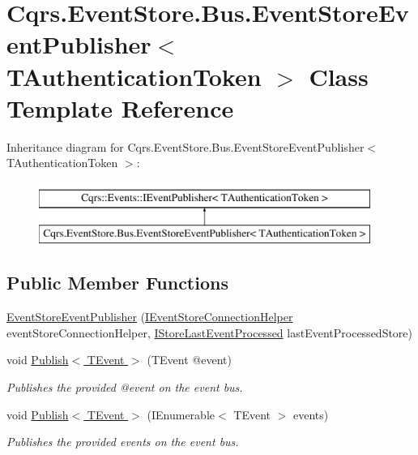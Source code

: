 \hypertarget{classCqrs_1_1EventStore_1_1Bus_1_1EventStoreEventPublisher}{}\section{Cqrs.\+Event\+Store.\+Bus.\+Event\+Store\+Event\+Publisher$<$ T\+Authentication\+Token $>$ Class Template Reference}
\label{classCqrs_1_1EventStore_1_1Bus_1_1EventStoreEventPublisher}
Inheritance diagram for Cqrs.\+Event\+Store.\+Bus.\+Event\+Store\+Event\+Publisher$<$ T\+Authentication\+Token $>$\+:\begin{figure}[H]
\begin{center}
\leavevmode
\includegraphics[height=2.000000cm]{classCqrs_1_1EventStore_1_1Bus_1_1EventStoreEventPublisher}
\end{center}
\end{figure}
\subsection*{Public Member Functions}
\begin{DoxyCompactItemize}
\item 
\hyperlink{classCqrs_1_1EventStore_1_1Bus_1_1EventStoreEventPublisher_a4ca16479fe387fae0135865ae3f889d7_a4ca16479fe387fae0135865ae3f889d7}{Event\+Store\+Event\+Publisher} (\hyperlink{interfaceCqrs_1_1EventStore_1_1IEventStoreConnectionHelper}{I\+Event\+Store\+Connection\+Helper} event\+Store\+Connection\+Helper, \hyperlink{interfaceCqrs_1_1Bus_1_1IStoreLastEventProcessed}{I\+Store\+Last\+Event\+Processed} last\+Event\+Processed\+Store)
\item 
void \hyperlink{classCqrs_1_1EventStore_1_1Bus_1_1EventStoreEventPublisher_a1ebb6f08648bdfd5c5bd29fcc12adfea_a1ebb6f08648bdfd5c5bd29fcc12adfea}{Publish$<$ T\+Event $>$} (T\+Event @event)
\begin{DoxyCompactList}\small\item\em Publishes the provided {\itshape @event}  on the event bus. \end{DoxyCompactList}\item 
void \hyperlink{classCqrs_1_1EventStore_1_1Bus_1_1EventStoreEventPublisher_a85b4922ff01b088b01b39463681c6eb6_a85b4922ff01b088b01b39463681c6eb6}{Publish$<$ T\+Event $>$} (I\+Enumerable$<$ T\+Event $>$ events)
\begin{DoxyCompactList}\small\item\em Publishes the provided {\itshape events}  on the event bus. \end{DoxyCompactList}\end{DoxyCompactItemize}
